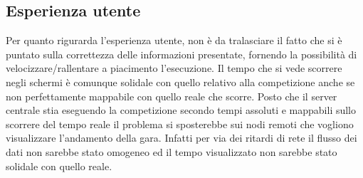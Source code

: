 \subsection{Esperienza utente}
Per quanto rigurarda l’esperienza utente, non è da tralasciare il fatto che si è puntato sulla correttezza delle informazioni presentate, fornendo la possibilità di velocizzare/rallentare a piacimento l’esecuzione. Il tempo che si vede scorrere negli schermi è comunque solidale con quello relativo alla competizione anche se non perfettamente mappabile con quello reale che scorre. Posto che il server centrale stia eseguendo la competizione secondo tempi assoluti e mappabili sullo scorrere del tempo reale il problema si sposterebbe sui nodi remoti che vogliono visualizzare l'andamento della gara. Infatti per via dei ritardi di rete il flusso dei dati non sarebbe stato omogeneo ed il tempo visualizzato non sarebbe stato solidale con quello reale.